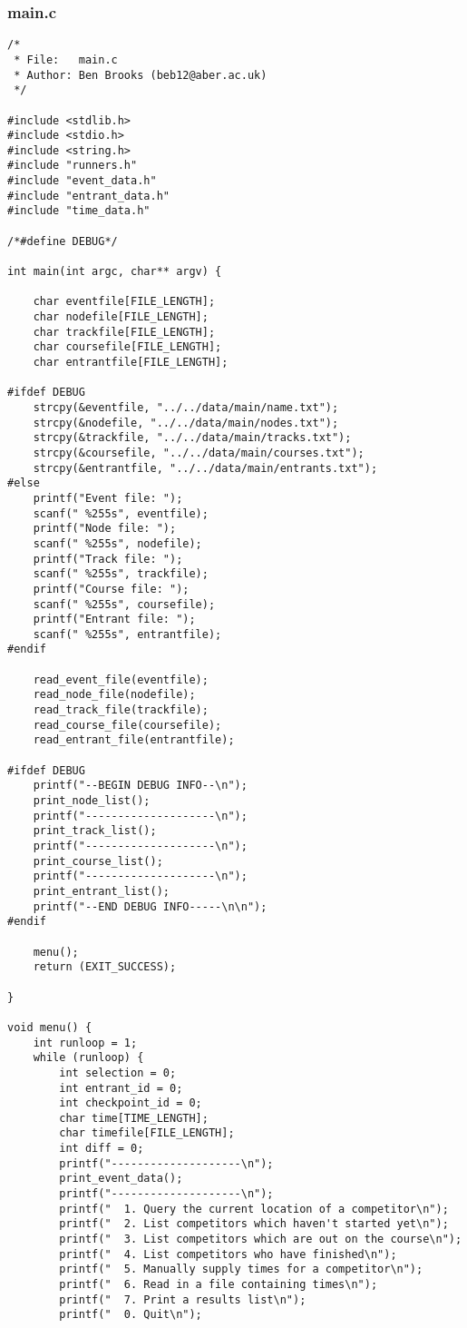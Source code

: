 \documentclass[pdftex,12pt,a4paper]{article}
\begin{document}
\subsubsection{main.c}
\begin{verbatim}
/*
 * File:   main.c
 * Author: Ben Brooks (beb12@aber.ac.uk)
 */

#include <stdlib.h>
#include <stdio.h>
#include <string.h>
#include "runners.h"
#include "event_data.h"
#include "entrant_data.h"
#include "time_data.h"

/*#define DEBUG*/

int main(int argc, char** argv) {

	char eventfile[FILE_LENGTH];
	char nodefile[FILE_LENGTH];
	char trackfile[FILE_LENGTH];
	char coursefile[FILE_LENGTH];
	char entrantfile[FILE_LENGTH];

#ifdef DEBUG
    strcpy(&eventfile, "../../data/main/name.txt");
    strcpy(&nodefile, "../../data/main/nodes.txt");
    strcpy(&trackfile, "../../data/main/tracks.txt");
    strcpy(&coursefile, "../../data/main/courses.txt");
    strcpy(&entrantfile, "../../data/main/entrants.txt");
#else
	printf("Event file: ");
	scanf(" %255s", eventfile);
	printf("Node file: ");
	scanf(" %255s", nodefile);
	printf("Track file: ");
	scanf(" %255s", trackfile);
	printf("Course file: ");
	scanf(" %255s", coursefile);
	printf("Entrant file: ");
	scanf(" %255s", entrantfile);
#endif

    read_event_file(eventfile);
    read_node_file(nodefile);
    read_track_file(trackfile);
    read_course_file(coursefile);
    read_entrant_file(entrantfile);

#ifdef DEBUG
    printf("--BEGIN DEBUG INFO--\n");
    print_node_list();
    printf("--------------------\n");
    print_track_list();
    printf("--------------------\n");
    print_course_list();
    printf("--------------------\n");
    print_entrant_list();
    printf("--END DEBUG INFO-----\n\n");
#endif

    menu();
	return (EXIT_SUCCESS);

}

void menu() {
	int runloop = 1;
	while (runloop) {
		int selection = 0;
        int entrant_id = 0;
        int checkpoint_id = 0;
        char time[TIME_LENGTH];
        char timefile[FILE_LENGTH];
        int diff = 0;
        printf("--------------------\n");
        print_event_data();
        printf("--------------------\n");
		printf("  1. Query the current location of a competitor\n");
		printf("  2. List competitors which haven't started yet\n");
		printf("  3. List competitors which are out on the course\n");
		printf("  4. List competitors who have finished\n");
		printf("  5. Manually supply times for a competitor\n");
		printf("  6. Read in a file containing times\n");
		printf("  7. Print a results list\n");
		printf("  0. Quit\n");


\end{verbatim}
\end{document}
